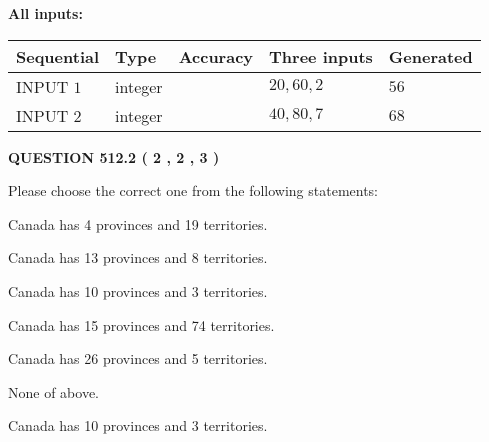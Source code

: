 \documentclass[12pt]{article}
\begin{document}
   
   
   
\noindent{}
   
   
   
   
\noindent\vspace{0.1in}\hspace{-0.08in} {\textbf{\Large{All inputs: }}}
   
   
  
  
\noindent\begin{tabular}{|l|l|l|l|l|}
\hline
 Sequential & Type & Accuracy & Three inputs & Generated \\ 
\hline
 
 
  INPUT $  1 $ & integer &  & $
 20
 , 
 60
 , 
 2
 $ & $ 56 $ 
 \\  \hline  
 
 
  INPUT $  2 $ & integer &  & $
 40
 , 
 80
 , 
 7
 $ & $ 68 $ 
 \\  \hline  
 \end{tabular}
   
   
  
\vspace{0.2in}
  
{\textbf{\Large{QUESTION
512.2 
 ( 2 , 2 , 3 )
}}}
  
  
Please choose the correct one from the following statements:
 
 
Canada has   4 provinces and  19 territories.
 
 
Canada has  13 provinces and  8 territories.
 
 
Canada has 10  provinces and 3 territories.
 
 
Canada has  15 provinces and  74 territories.
 
 
Canada has  26 provinces and  5 territories.
 
 
 None of above.
 
 
\noindent{}
 
 
Canada has 10  provinces and 3 territories.
 
 
\noindent{}
 
 
   
\end{document}
